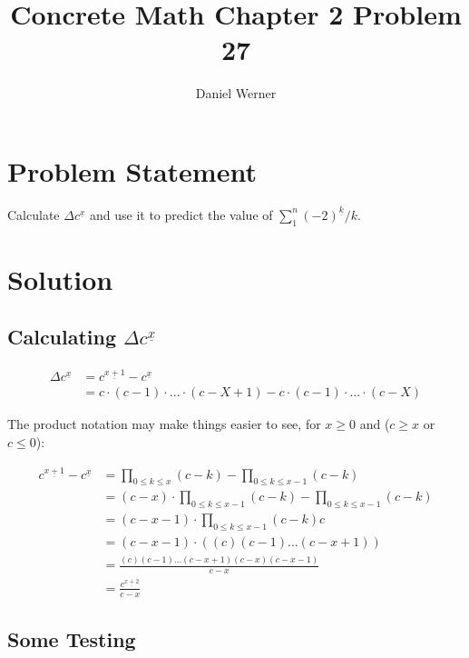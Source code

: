 \documentclass{article}
\title{Concrete Math Chapter 2 Problem 27}
\author{Daniel Werner}
\begin{document}
\maketitle

\section*{Problem Statement}

Calculate $\Delta c^{\underline{x}}$ and use it to predict
the value of $\sum_1^n (-2)^{\underline{k}}/k$.

\section*{Solution}

\subsection*{Calculating $\Delta c^{\underline{x}}$}

\begin{align*}
    \Delta c^{\underline{x}} &= c^{\underline{x+1}} - c^{\underline{x}} \\
    &= c \cdot (c - 1) \cdot ... \cdot (c - X + 1) - 
    c \cdot (c - 1) \cdot ... \cdot (c - X)
\end{align*}

The product notation may make things easier to see,
 for $x \geq 0$ and ($c \geq x$ or $c \leq 0$):

 \begin{align*}
    c^{\underline{x+1}} - c^{\underline{x}}
    &= \prod_{0 \leq k \leq x} (c - k)
    - \prod_{0 \leq k \leq x - 1} (c - k) \\
    &= (c - x) \cdot \prod_{0 \leq k \leq x - 1} (c - k)
    - \prod_{0 \leq k \leq x - 1} (c - k) \\
    &= (c - x - 1) \cdot \prod_{0 \leq k \leq x - 1} (c - k)c \\
    &= (c - x - 1) \cdot ((c)(c-1)...(c-x+1)) \\
    &= \frac{(c)(c - 1)...(c - x + 1)(c - x)(c - x - 1)}{c - x} \\
    &= \frac{c^{\underline{x+2}}}{c - x}
 \end{align*}

 \subsection*{Some Testing}
\end{document}
